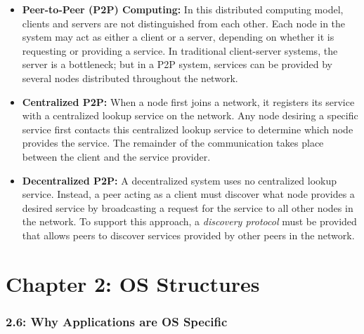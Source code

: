 \documentclass[12pt]{article}
\begin{document}
\begin{itemize}
    \item \textbf{Peer-to-Peer (P2P) Computing:} In this distributed computing model, clients and servers are not distinguished from each other. Each node in the system may act as either a client or a server, depending on whether it is requesting or providing a service. In traditional client-server systems, the server is a bottleneck; but in a P2P system, services can be provided by several nodes distributed throughout the network.
    \item \textbf{Centralized P2P:} When a node first joins a network, it registers its service with a centralized lookup service on the network. Any node desiring a specific service first contacts this centralized lookup service to determine which node provides the service. The remainder of the communication takes place between the client and the service provider.
    \item \textbf{Decentralized P2P:} A decentralized system uses no centralized lookup service. Instead, a peer acting as a client must discover what node provides a desired service by broadcasting a request for the service to all other nodes in the network. To support this approach, a \textit{discovery protocol} must be provided that allows peers to discover services provided by other peers in the network.
\end{itemize}

\part*{Chapter 2: OS Structures}

\section*{2.6: Why Applications are OS Specific}
\end{document}
